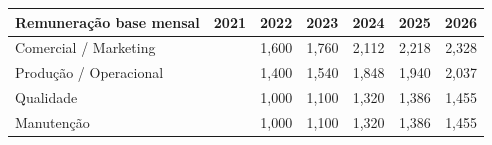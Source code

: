 \documentclass[11pt]{article}
\begin{document}
	\begin{center}
		\begin{tabular}{|l|l|r|r|r|r|r|}
			\hline
			Remuneração base  mensal & 2021 & \multicolumn{1}{l|}{2022} & \multicolumn{1}{l|}{2023} & \multicolumn{1}{l|}{2024} & \multicolumn{1}{l|}{2025} & \multicolumn{1}{l|}{2026} \\ \hline
			Comercial / Marketing    &      & 1,600                     & 1,760                     & 2,112                     & 2,218                     & 2,328                     \\ \hline
			Produção / Operacional   &      & 1,400                     & 1,540                     & 1,848                     & 1,940                     & 2,037                     \\ \hline
			Qualidade                &      & 1,000                     & 1,100                     & 1,320                     & 1,386                     & 1,455                     \\ \hline
			Manutenção               &      & 1,000                     & 1,100                     & 1,320                     & 1,386                     & 1,455                     \\ \hline
		\end{tabular}
	\end{center}
	
\end{document}
